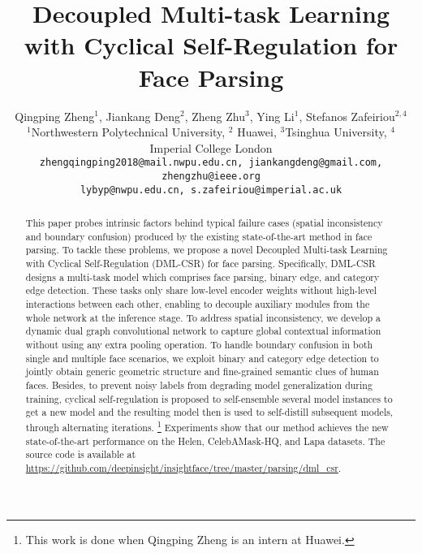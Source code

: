 \documentclass[10pt,twocolumn,letterpaper]{article}
\renewcommand\thefootnote{}
\begin{document}
\title{Decoupled Multi-task Learning with Cyclical Self-Regulation for Face Parsing}

\author{Qingping Zheng$^1$, Jiankang Deng$^2$, Zheng Zhu$^3$, Ying Li$^1$, Stefanos Zafeiriou$^{2,4}$\\
\small $^1$Northwestern Polytechnical University, $^2$ Huawei, $^3$Tsinghua University, $^4$Imperial College London\\
{\tt\small zhengqingping2018@mail.nwpu.edu.cn, jiankangdeng@gmail.com, zhengzhu@ieee.org} \\
{\tt\small lybyp@nwpu.edu.cn, s.zafeiriou@imperial.ac.uk}
}
\maketitle

\begin{abstract}

This paper probes intrinsic factors behind typical failure cases (\eg spatial inconsistency and boundary confusion) produced by the existing state-of-the-art method in face parsing. To tackle these problems, we propose a novel Decoupled Multi-task Learning with Cyclical Self-Regulation (DML-CSR) for face parsing. Specifically, DML-CSR designs a multi-task model which comprises face parsing, binary edge, and category edge detection. 
These tasks only share low-level encoder weights without high-level interactions between each other, enabling to decouple auxiliary modules from the whole network at the inference stage.
To address spatial inconsistency, we develop a dynamic dual graph convolutional network to capture global contextual information without using any extra pooling operation.
To handle boundary confusion in both single and multiple face scenarios, we exploit binary and category edge detection to jointly obtain generic geometric structure and fine-grained semantic clues of human faces.
Besides, to prevent noisy labels from degrading model generalization during training, cyclical self-regulation is proposed to self-ensemble several model instances to get a new model and the resulting model then is used to self-distill subsequent models, through alternating iterations.
\footnote{This work is done when Qingping Zheng is an intern at Huawei.} 
\setcounter{footnote}{0}
\renewcommand\thefootnote{\arabic{footnote}}
Experiments show that our method achieves the new state-of-the-art performance on the Helen, CelebAMask-HQ, and Lapa datasets. 
The source code is available at \url{https://github.com/deepinsight/insightface/tree/master/parsing/dml_csr}.
\end{abstract}
\end{document}
